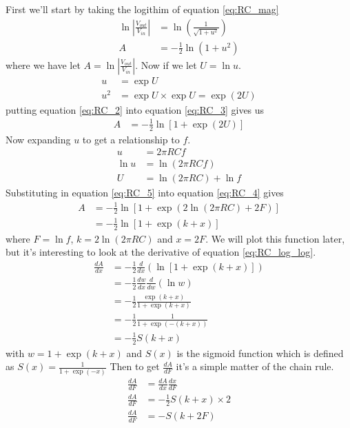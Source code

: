 First we'll start by taking the logithim of equation \ref{eq:RC_mag}
\begin{align}
  \ln \left|\frac{V_{out}}{V_{in}}\right| &= \ln \left( \frac{1}{\sqrt{1+u^2}} \right) \nonumber \\
  A&=-\frac{1}{2}\ln \left( 1+u^2 \right)
\end{align}
where we have let $A=\ln \left|\frac{V_{out}}{V_{in}}\right|$. Now if we let
$U=\ln u$. \label{eq:RC_2}
\begin{align}
  u &= \exp U \nonumber \\
  u^2 &= \exp U \times \exp U = \exp \left( 2 U\right)\label{eq:RC_3}
\end{align}
putting equation \ref{eq:RC_2} into equation \ref{eq:RC_3} gives us
\begin{align}
  A&=-\frac{1}{2}\ln \left[ 1+\exp \left( 2 U\right) \right] \label{eq:RC_4}
\end{align}
Now expanding $u$ to get a relationship to $f$.
\begin{align}
  u &= 2 \pi R C f \nonumber \\
  \ln u &= \ln \left( 2 \pi R C f \right) \nonumber \\
  U &= \ln \left( 2 \pi R C \right)+ \ln f \label{eq:RC_5}
\end{align}
Substituting in equation \ref{eq:RC_5} into equation \ref{eq:RC_4} gives
\begin{align}
  A&=-\frac{1}{2}\ln \left[ 1+\exp \left( 2 \ln \left( 2 \pi R C \right) + 2 F\right) \right] \nonumber \\
  &=-\frac{1}{2}\ln \left[ 1+\exp \left( k + x \right) \right] \label{eq:RC_log_log}
\end{align}
where $F=\ln f$, $k=2 \ln \left( 2 \pi R C \right)$ and $x=2F$.
We will plot this function later, but it's interesting to look at the derivative of equation \ref{eq:RC_log_log}.
\begin{align}
  \frac{dA}{dx}&=-\frac{1}{2} \frac{d}{dx}\left(\ln \left[ 1+\exp \left( k + x \right) \right]\right) \nonumber \\
  &=-\frac{1}{2} \frac{d w}{dx}\frac{d}{dw}\left(\ln w\right) \nonumber \\
  &=-\frac{1}{2} \frac{\exp \left( k + x \right)}{1+\exp \left( k + x \right)} \nonumber \\
  &=-\frac{1}{2} \frac{1}{1+\exp \left( -(k+x) \right)} \nonumber \\
  &=-\frac{1}{2} S(k+x) \label{eq:RC_6}
\end{align}
with $w=1+\exp \left( k + x \right)$ and $S(x)$ is the sigmoid function which is
defined as $S(x)=\frac{1}{1+\exp\left(-x\right)}$
Then to get $\frac{dA}{dF}$ it's a simple matter of the chain rule.
\begin{align}
  \frac{dA}{dF} &= \frac{dA}{dx}\frac{dx}{dF} \nonumber \\
  \frac{dA}{dF}&=-\frac{1}{2} S(k+x)\times 2 \nonumber \\
  \frac{dA}{dF}&= -S(k+2F)
\end{align}
